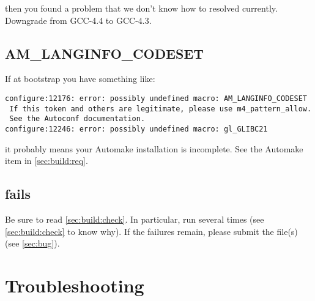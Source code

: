 \noindent
then you found a problem that we don't know how to resolved currently.
Downgrade from GCC-4.4 to GCC-4.3.

\subsection{AM\_LANGINFO\_CODESET}

If at bootstrap you have something like:

\begin{verbatim}
configure:12176: error: possibly undefined macro: AM_LANGINFO_CODESET
 If this token and others are legitimate, please use m4_pattern_allow.
 See the Autoconf documentation.
configure:12246: error: possibly undefined macro: gl_GLIBC21
\end{verbatim}

\noindent
it probably means your Automake installation is incomplete.  See the
Automake item in \autoref{sec:build:req}.


\subsection{ fails}

Be sure to read \autoref{sec:build:check}.  In particular, run  several times (see \autoref{sec:build:check} to know why).  If the
failures remain, please submit the  file(s) (see
\autoref{sec:bug}).

\section{Troubleshooting}

